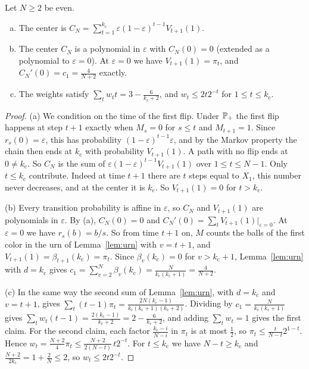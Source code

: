 \begin{proposition}\label{prop:first-mutation}
Let $N\ge2$ be even.
\begin{enumerate}[(a)]
\item The center is
$C_N=\sum_{t=1}^{k_{\mathrm c}}\varepsilon(1-\varepsilon)^{t-1}V_{t+1}(1)$.
\item The center $C_N$ is a polynomial in $\varepsilon$ with $C_N(0)=0$
(extended as a polynomial to $\varepsilon=0$). At
$\varepsilon=0$ we have $V_{t+1}(1)=\pi_t$, and
$C_N'(0)=c_1=\frac4{N+2}$ exactly.
\item The weights satisfy $\sum_tw_tt=3-\frac6{{k_{\mathrm c}}+2}$, and $w_t\le2t2^{-t}$
for $1\le t\le {k_{\mathrm c}}$.
\end{enumerate}
\end{proposition}

\begin{proof}
(a) We condition on the time of the first flip. Under $\mathbb{P}_+$ the first
flip happens at step $t+1$ exactly when $M_s=0$ for $s\le t$ and $M_{t+1}=1$.
Since $r_s(0)=\varepsilon$, this has probability
$(1-\varepsilon)^{t-1}\varepsilon$, and by the Markov property the chain then
ends at ${k_{\mathrm c}}$ with probability $V_{t+1}(1)$. A path with no flip ends at
$0\ne {k_{\mathrm c}}$. So $C_N$ is the sum of $\varepsilon(1-\varepsilon)^{t-1}V_{t+1}(1)$
over $1\le t\le N-1$. Only $t\le {k_{\mathrm c}}$ contribute. Indeed at time $t+1$ there
are $t$ steps equal to $X_1$, this number never decreases, and at the center
it is ${k_{\mathrm c}}$. So $V_{t+1}(1)=0$ for $t>{k_{\mathrm c}}$.

(b) Every transition probability is affine in $\varepsilon$, so $C_N$ and
$V_{t+1}(1)$ are polynomials in $\varepsilon$. By (a), $C_N(0)=0$ and
$C_N'(0)=\sum_tV_{t+1}(1)|_{\varepsilon=0}$. At $\varepsilon=0$ we have
$r_s(b)=b/s$. So from time $t+1$ on, $M$ counts the balls of the first
color in the urn of Lemma~\ref{lem:urn} with $v=t+1$, and
$V_{t+1}(1)=\beta_{t+1}({k_{\mathrm c}})=\pi_t$. Since $\beta_v({k_{\mathrm c}})=0$ for $v>{k_{\mathrm c}}+1$,
Lemma~\ref{lem:urn} with $d={k_{\mathrm c}}$ gives
$c_1=\sum_{v=2}^N\beta_v({k_{\mathrm c}})=\frac N{{k_{\mathrm c}}({k_{\mathrm c}}+1)}=\frac4{N+2}$.

(c) In the same way the second sum of Lemma~\ref{lem:urn}, with $d={k_{\mathrm c}}$ and
$v=t+1$, gives $\sum_t(t-1)\pi_t=\frac{2N({k_{\mathrm c}}-1)}{{k_{\mathrm c}}({k_{\mathrm c}}+1)({k_{\mathrm c}}+2)}$. Dividing by
$c_1=\frac N{{k_{\mathrm c}}({k_{\mathrm c}}+1)}$ gives $\sum_tw_t(t-1)=\frac{2({k_{\mathrm c}}-1)}{{k_{\mathrm c}}+2}=2-\frac6{{k_{\mathrm c}}+2}$,
and adding $\sum_tw_t=1$ gives the first claim. For the second claim, each
factor $\frac{{k_{\mathrm c}}-i}{N-i}$ in $\pi_t$ is at most $\frac12$, so
$\pi_t\le\frac t{N-t}2^{1-t}$. Hence
$w_t=\frac{N+2}4\pi_t\le\frac{N+2}{2(N-t)}\,t2^{-t}$. For $t\le {k_{\mathrm c}}$ we have
$N-t\ge {k_{\mathrm c}}$ and $\frac{N+2}{2{k_{\mathrm c}}}=1+\frac2N\le2$, so $w_t\le2t2^{-t}$.
\end{proof}

